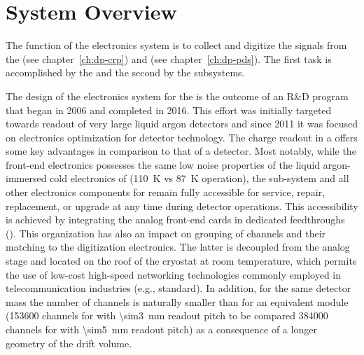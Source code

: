 \section{System Overview}
\label{sec:dp-tpcelec-overview}

The function of the   electronics system is to collect and digitize the signals from the  (see chapter~\ref{ch:dp-crp}) and  (see chapter~\ref{ch:dp-pds}). The first task is accomplished by the  and the second by the  subsystems. 

The design of the electronics system for the   is the outcome of an R\&D program that began in 2006 and completed in 2016. This effort was initially targeted towards readout of very large liquid argon detectors and since 2011 it was focused on electronics optimization for  detector technology. The charge readout in a   offers some key advantages in comparison to that of a  detector. Most notably, while the  front-end electronics possesses the same low noise properties of the liquid argon-immersed cold electronics of  (\SI{110}{\kelvin} vs \SI{87}{\kelvin} operation), the sub-system and all other electronics components for  remain fully accessible for service, repair, replacement, or upgrade at any time during detector operations. This accessibility is achieved by integrating the analog front-end cards in dedicated feedthroughs (). This organization has also an impact on grouping of channels and their matching to the digitization electronics. The latter is decoupled from the analog stage and located on the roof of the cryostat at room temperature, which permits the use of low-cost high-speed networking technologies commonly employed in telecommunication industries (e.g.,  standard). In addition, for the same detector mass the number of  channels is naturally smaller than for an  equivalent module (\num{153600} channels for  with \SI{\sim3}{\mm} readout pitch to be compared \num{384000} channels for  with \SI{\sim5}{\mm} readout pitch) as a consequence of a longer geometry of the drift volume. 

